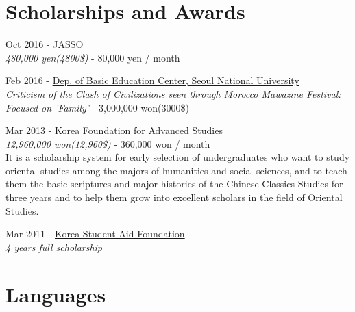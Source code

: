 \documentclass[10pt]{article} %
\begin{document}

\section{Scholarships and Awards}

{
Oct 2016 - \href{http://www.jasso.go.jp/ryugaku/tantosha/study_a/short_term_h/index.html}{JASSO}\\
\textit{480,000 yen(4800\$)} - 80,000 yen / month\\
}

{
Feb 2016 - \href{http://liberaleduenglish.snu.ac.kr/}{Dep. of Basic Education Center, Seoul National University}\\
\textit{Criticism of the Clash of Civilizations seen through Morocco Mawazine Festival: Focused on 'Family'} - 3,000,000 won(3000\$)\\
}

{
Mar 2013 - \href{http://www.kfas.or.kr/?pCulture=en}{Korea Foundation for Advanced Studies}\\
\textit{12,960,000 won(12,960\$)} - 360,000 won / month\\
It is a scholarship system for early selection of undergraduates who want to study oriental studies among the majors of humanities and social sciences, and to teach them the basic scriptures and major histories of the Chinese Classics Studies for three years and to help them grow into excellent scholars in the field of Oriental Studies.
}

{
Mar 2011 - \href{http://eng.kosaf.go.kr/jsp/main.jsp}{Korea Student Aid Foundation}\\
\textit{4 years full scholarship}\\
}


\section{Languages}
\end{document}
